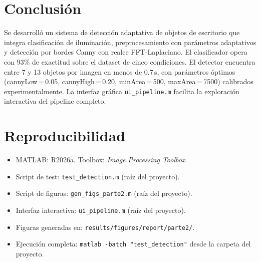 \documentclass[11pt,a4paper]{article}
\begin{document}
\section{Conclusión}
\label{sec:conclusion}

Se desarrolló un sistema de detección adaptativa de objetos de escritorio que
integra clasificación de iluminación, preprocesamiento con parámetros adaptativos
y detección por bordes Canny con realce FFT-Laplaciano. El clasificador opera con
93\% de exactitud sobre el dataset de cinco condiciones. El detector encuentra
entre 7 y 13 objetos por imagen en menos de 0.7\,s, con parámetros óptimos
(cannyLow\,=\,0.05, cannyHigh\,=\,0.20, minArea\,=\,500, maxArea\,=\,7500)
calibrados experimentalmente. La interfaz gráfica \texttt{ui\_pipeline.m}
facilita la exploración interactiva del pipeline completo.

\appendix
\section{Reproducibilidad}

\begin{itemize}
    \item MATLAB: R2026a. Toolbox: \textit{Image Processing Toolbox}.
    \item Script de test: \texttt{test\_detection.m} (raíz del proyecto).
    \item Script de figuras: \texttt{gen\_figs\_parte2.m} (raíz del proyecto).
    \item Interfaz interactiva: \texttt{ui\_pipeline.m} (raíz del proyecto).
    \item Figuras generadas en: \texttt{results/figures/report/parte2/}.
    \item Ejecución completa: \texttt{matlab -batch "test\_detection"} desde
          la carpeta del proyecto.
\end{itemize}
\end{document}
